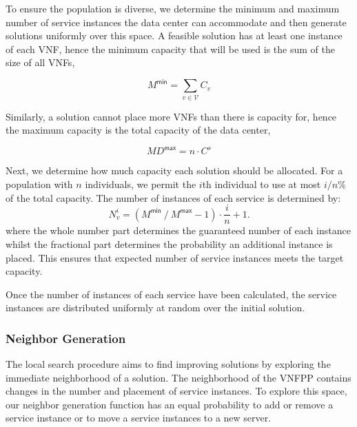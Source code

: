 
To ensure the population is diverse, we determine the minimum and maximum number of service instances the data center can accommodate and then generate solutions uniformly over this space. A feasible solution has at least one instance of each VNF, hence the minimum capacity that will be used is the sum of the size of all VNFs,

\begin{equation}
    M^\textsf{min} = \sum_{v\in \mathcal{V}} C_v
\end{equation}

\noindent Similarly, a solution cannot place more VNFs than there is capacity for, hence the maximum capacity is the total capacity of the data center,

\begin{equation}
    MD^\textsf{max} = n \cdot C^s
\end{equation}

\noindent Next, we determine how much capacity each solution should be allocated. For a population with $n$ individuals, we permit the $i$th individual to use at most $i / n$\% of the total capacity. The number of instances of each service is determined by:
\begin{equation}
    N_v^i = \left(M^\textsf{min}\ /\ M^\textsf{max} - 1 \right) \cdot \frac{i}{n} + 1.
\end{equation}
where the whole number part determines the guaranteed number of each instance whilst the fractional part determines the probability an additional instance is placed. This ensures that expected number of service instances meets the target capacity.

Once the number of instances of each service have been calculated, the service instances are distributed uniformly at random over the initial solution.

\subsubsection{Neighbor Generation}
\label{sec:local_search}
The local search procedure aims to find improving solutions by exploring the immediate neighborhood of a solution. The neighborhood of the VNFPP contains changes in the number and placement of service instances. To explore this space, our neighbor generation function has an equal probability to add or remove a service instance or to move a service instances to a new server.
